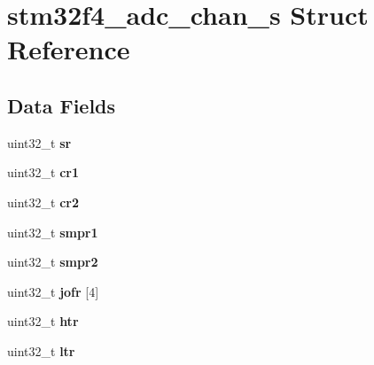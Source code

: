 \hypertarget{structstm32f4__adc__chan__s}{}\section{stm32f4\+\_\+adc\+\_\+chan\+\_\+s Struct Reference}
\label{structstm32f4__adc__chan__s}
\subsection*{Data Fields}
\begin{DoxyCompactItemize}
\item 
\mbox{\label{structstm32f4__adc__chan__s_a984d023454417a791fd219d3c32834c4}} 
uint32\+\_\+t {\bfseries sr}
\item 
\mbox{\label{structstm32f4__adc__chan__s_accc4b28198ebcde0674c84bc2ed06be7}} 
uint32\+\_\+t {\bfseries cr1}
\item 
\mbox{\label{structstm32f4__adc__chan__s_a6fd8ee6f2892b1fddaa7bd0943774ff6}} 
uint32\+\_\+t {\bfseries cr2}
\item 
\mbox{\label{structstm32f4__adc__chan__s_a07612ee3d0fdd344b9e10938a7b33908}} 
uint32\+\_\+t {\bfseries smpr1}
\item 
\mbox{\label{structstm32f4__adc__chan__s_a6da276839404ec45b5ad8beaedec39bc}} 
uint32\+\_\+t {\bfseries smpr2}
\item 
\mbox{\label{structstm32f4__adc__chan__s_a72807efe765782722af1041c973cc3e9}} 
uint32\+\_\+t {\bfseries jofr} \mbox{[}4\mbox{]}
\item 
\mbox{\label{structstm32f4__adc__chan__s_a284398d816d702c7080ae9c061d28040}} 
uint32\+\_\+t {\bfseries htr}
\item 
\mbox{\label{structstm32f4__adc__chan__s_a7bbfe430e7ec85b26ca2400e874c5208}} 
uint32\+\_\+t {\bfseries ltr}
\item 
\mbox{\label{structstm32f4__adc__chan__s_ab00ade6229c0c29c80054ace0a7c7755}} 

\end{DoxyCompactItemize}
